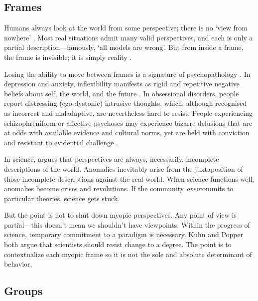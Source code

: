 \documentclass[11pt]{article}
\begin{document}
\subsection{Frames} 

Humans always look at the world from some perspective; there is no `view from nowhere' \citep{nagel1986view}. Most real situations admit many valid perspectives, and each is only a partial description---famously, `all models are wrong'. But from inside a frame, the frame is invisible; it is simply reality \citep{goffman1974frame, berger1966social, kuhn1970structure, wittgenstein1953philosophical}. 

Losing the ability to move between frames is a signature of psychopathology \citep{kashdan2010psychological}. In depression and anxiety, inflexibility manifests as rigid and repetitive negative beliefs about self, the world, and the future \citep{beck2011cognitive}. In obsessional disorders, people report distressing (ego-dystonic) intrusive thoughts, which, although recognised as incorrect and maladaptive, are nevertheless hard to resist. People experiencing schizophreniform or affective psychoses may experience bizarre delusions that are at odds with available evidence and cultural norms, yet are held with conviction and resistant to evidential challenge \citep{adams2013computational}. 

In science, \cite{kuhn1970structure} argues that perspectives are always, necessarily, incomplete descriptions of the world. Anomalies inevitably arise from the juxtaposition of those incomplete descriptions against the real world. When science functions well, anomalies become crises and revolutions. If the community \textit{over}commits to particular theories, science gets stuck.

But the point is not to shut down myopic perspectives. Any point of view is partial---this doesn't mean we shouldn't have viewpoints. Within the progress of science, temporary commitment to a paradigm is necessary. Kuhn and Popper \citep{popper1975rationality} both argue that scientists should resist change to a degree.  The point is to contextualize each myopic frame so it is not the sole and absolute determinant of behavior. 



\subsection{Groups} 
\end{document}
